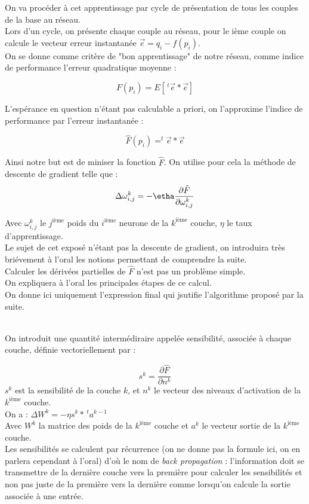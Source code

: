 \documentclass[a4paper, 11pt]{article}
\begin{document}
On va procéder à cet apprentissage par cycle de présentation de tous les couples de la base au réseau.\\
Lors d'un cycle, on présente chaque couple au réseau, pour le ième couple on calcule le vecteur erreur instantanée $\vec{e} = q_i-f(p_i)$.\\
On se donne comme critère de "bon apprentissage" de notre réseau, comme indice de performance l'erreur quadratique moyenne :

$$ F(p_i)  = E[\,^t  \vec{e} * \vec{e}]$$

L'espérance en question n'étant pas calculable a priori, on l'approxime l'indice de performance par l'erreur instantanée :

$$  \hat{F}(p_i) = ^t \vec{e}*\vec{e}$$

Ainsi notre but est de miniser la fonction $ \hat{F} $.
On utilise pour cela la méthode de descente de gradient telle que : \\

$$ 
	\Delta \omega^{k}_{i,j} = -\etha \frac{\partial \hat{F}}{\partial \omega^{k}_{i,j}}
$$

Avec $ \omega^{k}_{i,j}$ le $j^{\text{ième}}$ poids du $i^{\text{ième}}$ neurone de la $k^{\text{ième}}$ couche, $\eta$ le taux d'apprentissage.\\
Le sujet de cet exposé n'étant pas la descente de gradient, on introduira très briévement à l'oral les notions permettant de comprendre la suite.\\
Calculer les dérivées partielles de $\hat{F}$ n'est pas un problème simple.
\\ On expliquera à l'oral les principales étapes de ce calcul.
\\ On donne ici uniquement l'expression final qui jsutifie l'algorithme proposé par la suite.

\\ On introduit une quantité intermédiraire appelée sensibilité, associée à chaque couche, définie vectoriellement par : 

$$ s^k = \frac{\partial \hat{F} }{\partial{n^k}}$$
$s^k$ est la sensibilité de la couche $k$, et $n^k$ le vecteur des niveaux d'activation de la $k^{\text{ième}}$ couche.
\\
\noident On a : $\Delta W^k = -\eta s^k * \,^t a^{k-1}$
\\ Avec $W^k$ la matrice des poids de la $k^{\text{ième}}$ couche et $a^k$ le vecteur sortie de la $k^{\text{ième}}$ couche.
\\Les sensibilités se calculent par récurrence (on ne donne pas la formule ici, on en parlera cependant à l'oral) d'où le nom de \emph{back propagation} : l'information doit se transmettre de la dernière couche vers la première pour calculer les sensibilités et non pas juste de la première vers la dernière comme lorsqu'on calcule la sortie associée à une entrée.
\end{document}
